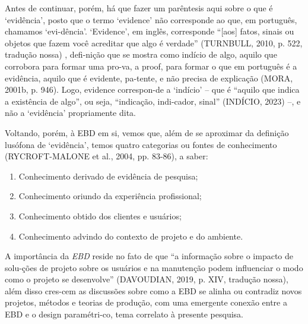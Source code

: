 \documentclass[twoside, 12pt, english,italian,latin,greek,french,spanish,brazil]{book}
\begin{document}
        Antes de continuar, porém, há que fazer um parêntesis aqui sobre o que é ‘evidência’, posto que o termo ‘evidence’ não corresponde ao que, em português, chamamos ‘evi-dência’. ‘Evidence’, em inglês, corresponde “[aos] fatos, sinais ou objetos que fazem você acreditar que algo é verdade” (TURNBULL, 2010, p. 522, tradução nossa) , defi-nição que se mostra como indício de algo, aquilo que corrobora para formar uma pro-va, a proof, para formar o que em português é a evidência, aquilo que é evidente, pa-tente, e não precisa de explicação (MORA, 2001b, p. 946).  Logo, evidence correspon-de a ‘indício’ – que é “aquilo que indica a existência de algo”, ou seja, “indicação, indi-cador, sinal” (INDÍCIO, 2023) –, e não a ‘evidência’ propriamente dita.

        Voltando, porém, à EBD em si, vemos que, além de se aproximar da definição lusófona de ‘evidência’, temos quatro categorias ou fontes de conhecimento (RYCROFT-MALONE et al., 2004, pp. 83-86),  a saber:
        \begin{enumerate}[label=\alph*)]
            \item Conhecimento derivado de evidência de pesquisa;
            \item Conhecimento oriundo da experiência profissional; 
            \item Conhecimento obtido dos clientes e usuários;
            \item Conhecimento advindo do contexto de projeto e do ambiente.
        \end{enumerate}

        A importância da \textit{EBD} reside no fato de que “a informação sobre o impacto de solu-ções de projeto sobre os usuários e na manutenção podem influenciar o modo como o projeto se desenvolve” (DAVOUDIAN, 2019, p. XIV, tradução nossa), além disso cres-cem as discussões sobre como a EBD se alinha ou contradiz novos projetos, métodos e teorias de produção, com uma emergente conexão entre a EBD e o design paramétri-co, tema correlato à presente pesquisa.
\end{document}
